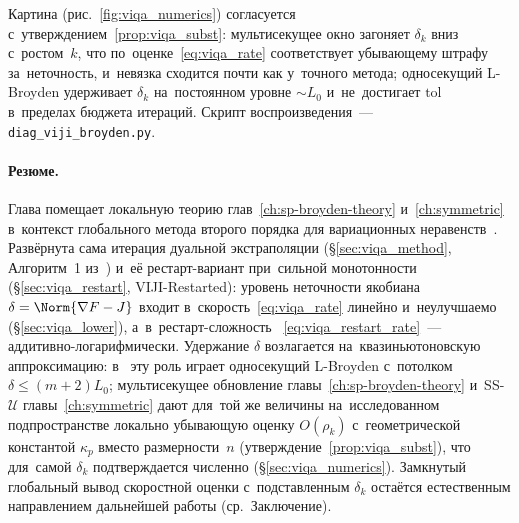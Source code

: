 Картина (рис.~\ref{fig:viqa_numerics}) согласуется
с~утверждением~\ref{prop:viqa_subst}: мультисекущее окно загоняет
$\delta_k$ вниз с~ростом~$k$, что по~оценке~\eqref{eq:viqa_rate}
соответствует убывающему штрафу за~неточность, и~невязка сходится почти
как у~точного метода; односекущий L-Broyden удерживает $\delta_k$
на~постоянном уровне $\sim L_0$ и~не~достигает $\mathrm{tol}$ в~пределах
бюджета итераций. Скрипт
воспроизведения~--- \texttt{diag\_viji\_broyden.py}.

\paragraph{Резюме.}\label{par:viqa-summary}
Глава помещает локальную теорию глав~\ref{ch:sp-broyden-theory}
и~\ref{ch:symmetric} в~контекст глобального метода второго порядка для
вариационных неравенств~\cite{viqa2024}. Развёрнута сама итерация дуальной
экстраполяции (\S\ref{sec:viqa_method}, Алгоритм~1 из~\cite{viqa2024})
и~её рестарт-вариант при~сильной монотонности
(\S\ref{sec:viqa_restart}, VIJI-Restarted): уровень неточности якобиана
$\delta=\Norm{\nabla F - J}$ входит в~скорость~\eqref{eq:viqa_rate}
линейно и~неулучшаемо (\S\ref{sec:viqa_lower}), а~в~рестарт-сложность
~\eqref{eq:viqa_restart_rate}~--- аддитивно-логарифмически. Удержание
$\delta$ возлагается на~квазиньютоновскую аппроксимацию: в~\cite{viqa2024}
эту роль играет односекущий L-Broyden с~потолком $\delta\le(m{+}2)L_0$;
мультисекущее обновление главы~\ref{ch:sp-broyden-theory} и~SS-$\mathcal{U}$
главы~\ref{ch:symmetric} дают для~той же величины на~исследованном
подпространстве локально убывающую оценку $O(\rho_k)$ с~геометрической
константой $\kappa_p$ вместо размерности~$n$
(утверждение~\ref{prop:viqa_subst}), что для~самой $\delta_k$ подтверждается
численно (\S\ref{sec:viqa_numerics}). Замкнутый глобальный вывод скоростной
оценки с~подставленным $\delta_k$ остаётся естественным направлением
дальнейшей работы (ср.~Заключение).
